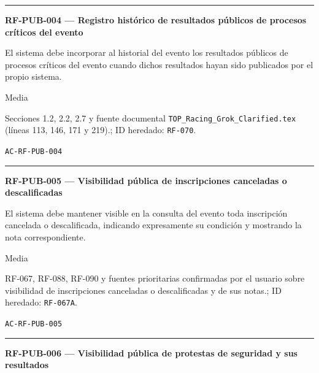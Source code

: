 \documentclass[10pt,letterpaper]{article}
\begin{document}
\vspace{0.25em}\hrule\vspace{0.65em}
\noindent\textbf{RF-PUB-004 --- Registro histórico de resultados públicos de procesos críticos del evento}\par
\begin{description}[style=nextline,leftmargin=3.15cm,labelwidth=2.8cm,font=\normalfont\bfseries]
\item[Obligación] El sistema debe incorporar al historial del evento los resultados públicos de procesos críticos del evento cuando dichos resultados hayan sido publicados por el propio sistema.
\item[Prioridad] Media
\item[Procedencia] Secciones 1.2, 2.2, 2.7 y fuente documental \texttt{TOP\_Racing\_Grok\_Clarified.tex} (líneas 113, 146, 171 y 219).; ID heredado: \texttt{RF-070}.
\item[Verificación] \texttt{AC-RF-PUB-004}
\end{description}
\vspace{0.25em}\hrule\vspace{0.65em}
\noindent\textbf{RF-PUB-005 --- Visibilidad pública de inscripciones canceladas o descalificadas}\par
\begin{description}[style=nextline,leftmargin=3.15cm,labelwidth=2.8cm,font=\normalfont\bfseries]
\item[Obligación] El sistema debe mantener visible en la consulta del evento toda inscripción cancelada o descalificada, indicando expresamente su condición y mostrando la nota correspondiente.
\item[Prioridad] Media
\item[Procedencia] RF-067, RF-088, RF-090 y fuentes prioritarias confirmadas por el usuario sobre visibilidad de inscripciones canceladas o descalificadas y de sus notas.; ID heredado: \texttt{RF-067A}.
\item[Verificación] \texttt{AC-RF-PUB-005}
\end{description}
\vspace{0.25em}\hrule\vspace{0.65em}
\noindent\textbf{RF-PUB-006 --- Visibilidad pública de protestas de seguridad y sus resultados}\par
\end{document}
